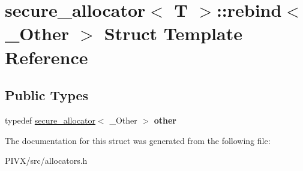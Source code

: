 \hypertarget{structsecure__allocator_1_1rebind}{}\section{secure\+\_\+allocator$<$ T $>$\+:\+:rebind$<$ \+\_\+\+Other $>$ Struct Template Reference}
\label{structsecure__allocator_1_1rebind}
\subsection*{Public Types}
\begin{DoxyCompactItemize}
\item 
\mbox{\label{structsecure__allocator_1_1rebind_aa0688d32e40d8ae116efec5946f1a3b5}} 
typedef \mbox{\hyperlink{structsecure__allocator}{secure\+\_\+allocator}}$<$ \+\_\+\+Other $>$ {\bfseries other}
\end{DoxyCompactItemize}


The documentation for this struct was generated from the following file\+:\begin{DoxyCompactItemize}
\item 
P\+I\+V\+X/src/allocators.\+h\end{DoxyCompactItemize}
